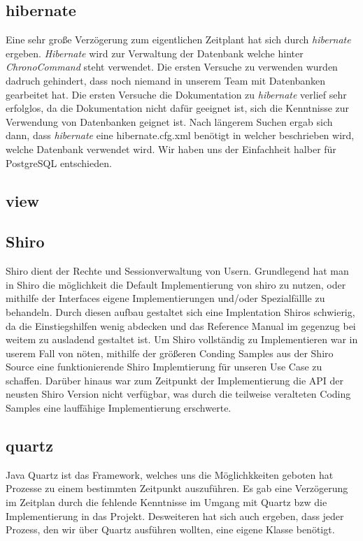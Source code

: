 \subsection{hibernate}
Eine sehr große Verzögerung zum eigentlichen Zeitplant hat sich durch \emph{hibernate} ergeben. \emph{Hibernate} wird zur Verwaltung der
Datenbank welche hinter \emph{ChronoCommand} steht verwendet. Die ersten Versuche  zu verwenden wurden dadruch
gehindert, dass noch niemand in unserem Team mit Datenbanken gearbeitet hat. Die ersten Versuche die Dokumentation zu 
\emph{hibernate} verlief sehr erfolglos, da die Dokumentation nicht dafür geeignet ist, sich die Kenntnisse zur Verwendung von
Datenbanken geignet ist. Nach längerem Suchen ergab sich dann, dass \emph{hibernate} eine hibernate.cfg.xml benötigt in welcher 
beschrieben wird, welche Datenbank verwendet wird. Wir haben uns der Einfachheit halber für PostgreSQL entschieden. 


\subsection{view} %
\subsection{Shiro}
Shiro dient der Rechte und Sessionverwaltung von Usern.
Grundlegend hat man in Shiro die möglichkeit die Default Implementierung von shiro zu nutzen, oder mithilfe der Interfaces
eigene Implementierungen und/oder Spezialfällle zu behandeln.
Durch diesen aufbau gestaltet sich eine Implentation Shiros schwierig, da die Einstiegshilfen wenig abdecken und das Reference Manual
im gegenzug bei weitem zu ausladend gestaltet ist. Um Shiro vollständig zu Implementieren war in userem Fall von nöten, mithilfe der
größeren Conding Samples aus der Shiro Source eine funktionierende Shiro Implemtierung für unseren Use Case zu schaffen.
Darüber hinaus war zum Zeitpunkt der Implementierung die API der neusten Shiro Version nicht verfügbar, was durch die teilweise veralteten Coding Samples
 eine lauffähige Implementierung erschwerte.
 
\subsection{quartz} %
Java Quartz ist das Framework, welches uns die Möglichkkeiten geboten hat Prozesse zu einem bestimmten Zeitpunkt auszuführen. Es gab eine Verzögerung im Zeitplan durch die fehlende Kenntnisse im Umgang mit Quartz bzw die Implementierung in das Projekt.
Desweiteren hat sich auch ergeben, dass jeder Prozess, den wir über Quartz ausführen wollten, eine eigene Klasse benötigt.

